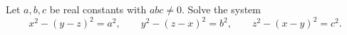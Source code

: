 Let $a,b,c$ be real constants with $abc\ne0$. Solve the system
\[
x^2-(y-z)^2=a^2,\qquad y^2-(z-x)^2=b^2,\qquad z^2-(x-y)^2=c^2 .
\]
